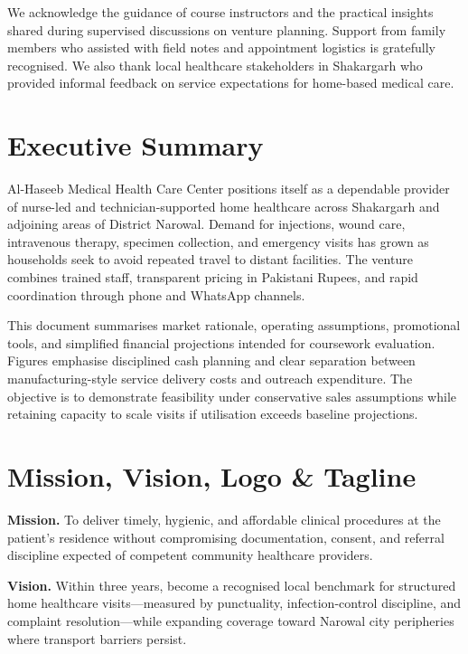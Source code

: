 \documentclass[12pt,a4paper]{report}
\begin{document}
We acknowledge the guidance of course instructors and the practical insights shared during supervised discussions on venture planning. Support from family members who assisted with field notes and appointment logistics is gratefully recognised. We also thank local healthcare stakeholders in Shakargarh who provided informal feedback on service expectations for home-based medical care.

\chapter*{Executive Summary}

Al-Haseeb Medical Health Care Center positions itself as a dependable provider of nurse-led and technician-supported home healthcare across Shakargarh and adjoining areas of District Narowal. Demand for injections, wound care, intravenous therapy, specimen collection, and emergency visits has grown as households seek to avoid repeated travel to distant facilities. The venture combines trained staff, transparent pricing in Pakistani Rupees, and rapid coordination through phone and WhatsApp channels.

This document summarises market rationale, operating assumptions, promotional tools, and simplified financial projections intended for coursework evaluation. Figures emphasise disciplined cash planning and clear separation between manufacturing-style service delivery costs and outreach expenditure. The objective is to demonstrate feasibility under conservative sales assumptions while retaining capacity to scale visits if utilisation exceeds baseline projections.

\chapter*{Mission, Vision, Logo \& Tagline}

\textbf{Mission.} To deliver timely, hygienic, and affordable clinical procedures at the patient's residence without compromising documentation, consent, and referral discipline expected of competent community healthcare providers.

\textbf{Vision.} Within three years, become a recognised local benchmark for structured home healthcare visits---measured by punctuality, infection-control discipline, and complaint resolution---while expanding coverage toward Narowal city peripheries where transport barriers persist.
\end{document}
